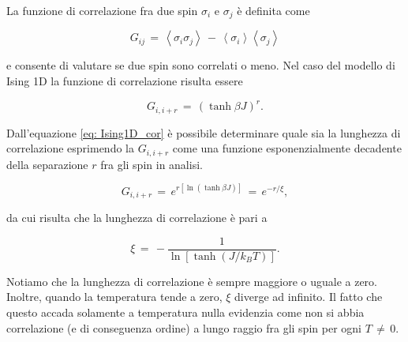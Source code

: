 La funzione di correlazione fra due spin $\sigma_i$ e $\sigma_j$ è definita come

\begin{equation}
    G_{ij}\,=\,\left<\sigma_i \sigma_j\right>\,-\,\left<\sigma_i\right>\left<\sigma_j\right>
    \label{eq: def_corr_fun_Ising1D}
\end{equation}

e consente di valutare se due spin sono correlati o meno. Nel caso del modello di Ising 1D la funzione di correlazione 
risulta essere

\begin{equation}
    G_{i, i+r}\,=\,\left(\tanh{\beta J}\right)^r.
    \label{eq: Ising1D_cor}
\end{equation}

Dall'equazione \eqref{eq: Ising1D_cor} è possibile determinare quale sia la lunghezza di correlazione esprimendo la 
$G_{i, i+r}$ come una funzione esponenzialmente decadente della separazione $r$ fra gli spin in analisi. 

\begin{equation}
    G_{i, i+r}\,=\,e^{r\left[\ln{\left(\tanh{\beta J}\right)}\right]}\,=\,e^{-r/\xi},
    \label{eq: Ising1D_corr_exp}
\end{equation}

da cui risulta che la lunghezza di correlazione è pari a 

\begin{equation}
    \xi\,=\,-\frac{1}{\ln{\left[\tanh{\left(J/k_B T\right)}\right]}}.
    \label{eq: lungh_corr}
\end{equation}

Notiamo che la lunghezza di correlazione è sempre maggiore o uguale a zero. Inoltre, quando la temperatura tende a zero, 
$\xi$ diverge ad infinito. Il fatto che questo accada solamente a temperatura nulla evidenzia come non si abbia correlazione 
(e di conseguenza ordine) a lungo raggio fra gli spin per ogni $T\,\neq\,0$.
